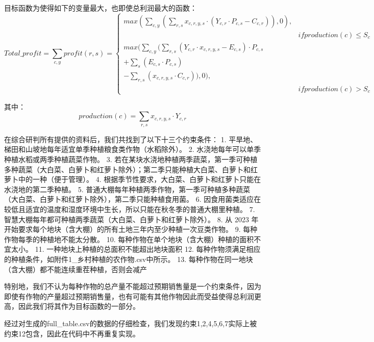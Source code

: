 \documentclass{cumcmthesis}
\begin{document}
目标函数为使得如下的变量最大，也即使总利润最大的函数：\\
\begin{equation}
    Total\_profit = \sum_{c, y} profit(r, s) = \begin{cases} 
        max(\sum_{c, y}(\sum_{r, s} x_{c, r, y, s} \cdot(Y_{c, r} \cdot P_{c, s} - C_{c, r})), 0), \\
            & if production(c) \leq S_c \\
        max(\sum_{c, y}(\sum_{r, s}(Y_{c, r} \cdot x_{c, r, y, s} - E_{c, s}) \cdot P_{c, s} \\
                    + \sum_{s}(E_{c, s} \cdot P_{c, s}) \\
                    - \sum_{r, s}(x_{c, r, y, s} \cdot C_{c, r})), 0), \\
            & if production(c) > S_c
    \end{cases}
\end{equation}

其中：
\begin{equation}
    production(c) = \sum_{r, s} x_{c,r,y,s} \cdot Y_{c,r}
\end{equation}

在综合研判所有提供的资料后，我们共找到了以下十三个约束条件：
1. 平旱地、梯田和山坡地每年适宜单季种植粮食类作物（水稻除外）。
2. 水浇地每年可以单季种植水稻或两季种植蔬菜作物。
3. 若在某块水浇地种植两季蔬菜，第一季可种植多种蔬菜（大白菜、白萝卜和红萝卜除外）；第二季只能种植大白菜、白萝卜和红萝卜中的一种（便于管理）。
4. 根据季节性要求，大白菜、白萝卜和红萝卜只能在水浇地的第二季种植。
5. 普通大棚每年种植两季作物，第一季可种植多种蔬菜（大白菜、白萝卜和红萝卜除外），第二季只能种植食用菌。
6. 因食用菌类适应在较低且适宜的温度和湿度环境中生长，所以只能在秋冬季的普通大棚里种植。
7. 智慧大棚每年都可种植两季蔬菜（大白菜、白萝卜和红萝卜除外）。
8. 从 2023 年开始要求每个地块（含大棚）的所有土地三年内至少种植一次豆类作物。
9. 每种作物每季的种植地不能太分散。
10. 每种作物在单个地块（含大棚）种植的面积不宜太小。
11. 一种地块上种植的总面积不能超出地块面积
12. 每种作物须满足相应的种植条件，如附件1\_乡村种植的农作物.csv中所示。
13. 每种作物在同一地块（含大棚）都不能连续重茬种植，否则会减产

特别地，我们不认为每种作物的总产量不能超过预期销售量是一个约束条件，因为即使有作物的产量超过预期销售量，也有可能有其他作物因此而受益使得总利润更高，因此我们将其作为目标函数的一部分。

经过对生成的full\_table.csv的数据的仔细检查，我们发现约束1,2,4,5,6,7实际上被约束12包含，因此在代码中不再重复实现。
\end{document}
